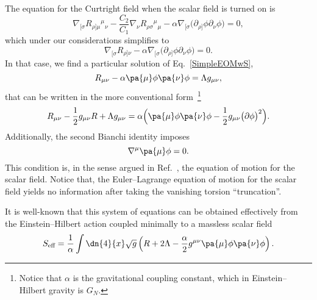 \documentclass[aps,prl,twocolumn,superscriptaddress,showpacs,showkeys]{revtex4-1}
\begin{document}
The equation for the Curtright field when the scalar field is turned on is
\begin{equation*}
  \nabla_{[\sigma} R_{\rho]\mu}{}^{\mu}{}_\nu - \frac{C_2}{C_1} \nabla_\nu  R_{\rho\sigma}{}^{\mu}{}_\mu - \alpha \nabla_{[\sigma} \Big( \partial_{\rho]}\phi \partial_\nu\phi \Big) = 0,
\end{equation*}
which under our considerations simplifies to 
\begin{equation}
  \nabla_{[\sigma} R_{\rho]\nu} - \alpha \nabla_{[\sigma} \Big( \partial_{\rho]}\phi \partial_\nu\phi \Big) = 0.
  \label{SimpleEOMwS}
\end{equation}
In that case, we find a particular solution of Eq.~\eqref{SimpleEOMwS},%
\begin{equation*}
  R_{\mu\nu} - \alpha \pa{\mu} \phi \pa{\nu} \phi = \Lambda g_{\mu\nu},
\end{equation*}
that can be written in the more conventional form~\footnote{Notice that $\alpha$ is the gravitational coupling constant, which in Einstein--Hilbert gravity is $G_N$.}
\begin{equation}
  R_{\mu\nu} - \frac{1}{2} g_{\mu\nu} R + \Lambda g_{\mu\nu} = \alpha \Big( \pa{\mu} \phi \pa{\nu} \phi - \frac{1}{2} g_{\mu\nu} \big( \partial\phi \big)^2 \Big).
\end{equation}
Additionally, the second Bianchi identity imposes
\begin{equation}
  \nabla^\mu \pa{\mu} \phi = 0.
\end{equation}
This condition is, in the sense argued in Ref.~\cite{Bekenstein:2014uwa}, the equation of motion for the scalar field. Notice that, the Euler--Lagrange equation of motion for the scalar field yields no information after taking the vanishing torsion ``truncation''.

It is well-known that this system of equations can be obtained effectively from the Einstein--Hilbert action coupled minimally to a massless scalar field
\begin{equation}
  S_{\text{eff}} = \frac{1}{\alpha} \int \dn{4}{x} \sqrt{g} \left( R + 2 \Lambda - \frac{\alpha}{2} g^{\mu\nu} \pa{\mu}\phi \pa{\nu} \phi \right).
\end{equation}
\end{document}

